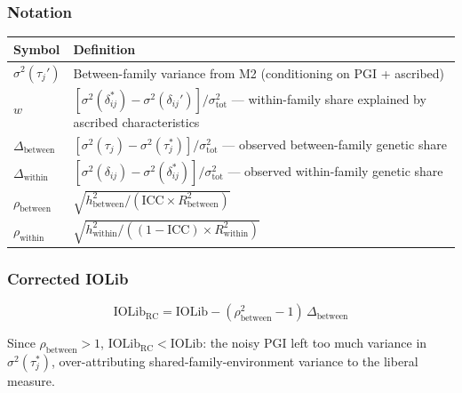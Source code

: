 \documentclass[
]{article}
\newcounter{none} %
\begin{document}
\subsubsection{Notation}\label{notation}

{\def\LTcaptype{none} %
\begin{longtable}[]{@{}
  >{\raggedright\arraybackslash}p{}
  >{\raggedright\arraybackslash}p{}@{}}
\toprule\noalign{}
\begin{minipage}[b]{\linewidth}\raggedright
Symbol
\end{minipage} & \begin{minipage}[b]{\linewidth}\raggedright
Definition
\end{minipage} \\
\midrule\noalign{}
\endhead
\bottomrule\noalign{}
\endlastfoot
\(\sigma^2(\tau_j')\) & Between-family variance from M2 (conditioning on
PGI + ascribed) \\
\(w\) &
\([\sigma^2(\delta_{ij}^*) - \sigma^2(\delta_{ij}')] / \sigma^2_\text{tot}\)
--- within-family share explained by ascribed characteristics \\
\(\Delta_\text{between}\) &
\([\sigma^2(\tau_j) - \sigma^2(\tau_j^*)] / \sigma^2_\text{tot}\) ---
observed between-family genetic share \\
\(\Delta_\text{within}\) &
\([\sigma^2(\delta_{ij}) - \sigma^2(\delta_{ij}^*)] / \sigma^2_\text{tot}\)
--- observed within-family genetic share \\
\(\rho_\text{between}\) &
\(\sqrt{h^2_\text{between} / (\text{ICC} \times R^2_\text{between})}\) \\
\(\rho_\text{within}\) &
\(\sqrt{h^2_\text{within} / ((1 - \text{ICC}) \times R^2_\text{within})}\) \\
\end{longtable}
}

\subsubsection{Corrected IOLib}\label{corrected-iolib}

\[\text{IOLib}_\text{RC} = \text{IOLib} - (\rho^2_\text{between} - 1)\,\Delta_\text{between}\]

Since \(\rho_\text{between} > 1\),
\(\text{IOLib}_\text{RC} < \text{IOLib}\): the noisy PGI left too much
variance in \(\sigma^2(\tau_j^*)\), over-attributing
shared-family-environment variance to the liberal measure.
\end{document}
